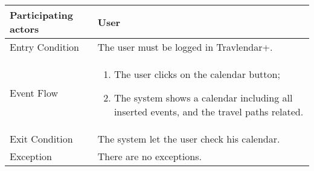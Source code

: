 \begin{table}[H]
	\begin{center}
		\begin{tabular}{ | p{} | p{} | }
		\hline
		Participating actors & User\\
		\hline
		Entry Condition & The user must be logged in Travlendar+.\\
		\hline
		Event Flow & 
			\begin{enumerate}
				\item The user clicks on the calendar button;
				\item The system shows a calendar including all inserted events, and the travel paths related.
			\end{enumerate} \\
		\hline
		Exit Condition & The system let the user check his calendar. \\
		\hline
		Exception & There are no exceptions.\\ 
		\hline
		\end{tabular}
	\end{center}
\end{table}